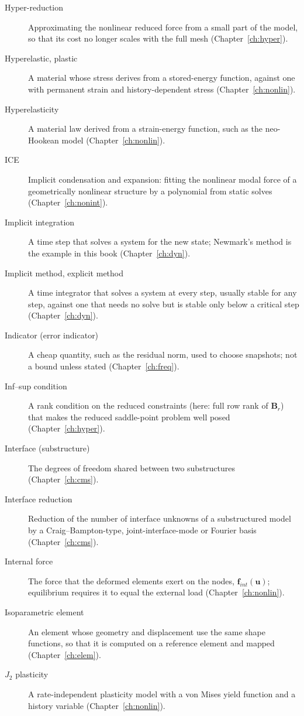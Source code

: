 \begin{description}
\item[Hyper-reduction] Approximating the nonlinear reduced force from a small part of the model, so that its cost no longer scales with the full mesh (Chapter~\ref{ch:hyper}).
\item[Hyperelastic, plastic] A material whose stress derives from a stored-energy function, against one with permanent strain and history-dependent stress (Chapter~\ref{ch:nonlin}).
\item[Hyperelasticity] A material law derived from a strain-energy function, such as the neo-Hookean model (Chapter~\ref{ch:nonlin}).
\item[ICE] Implicit condensation and expansion: fitting the nonlinear modal force of a geometrically nonlinear structure by a polynomial from static solves (Chapter~\ref{ch:nonint}).
\item[Implicit integration] A time step that solves a system for the new state; Newmark's method is the example in this book (Chapter~\ref{ch:dyn}).
\item[Implicit method, explicit method] A time integrator that solves a system at every step, usually stable for any step, against one that needs no solve but is stable only below a critical step (Chapter~\ref{ch:dyn}).
\item[Indicator (error indicator)] A cheap quantity, such as the residual norm, used to choose snapshots; not a bound unless stated (Chapter~\ref{ch:freq}).
\item[Inf--sup condition] A rank condition on the reduced constraints (here: full row rank of $\bm B_r$) that makes the reduced saddle-point problem well posed (Chapter~\ref{ch:hyper}).
\item[Interface (substructure)] The degrees of freedom shared between two substructures (Chapter~\ref{ch:cms}).
\item[Interface reduction] Reduction of the number of interface unknowns of a substructured model by a Craig--Bampton-type, joint-interface-mode or Fourier basis (Chapter~\ref{ch:cms}).
\item[Internal force] The force that the deformed elements exert on the nodes, $\bm f_{int}(\bm u)$; equilibrium requires it to equal the external load (Chapter~\ref{ch:nonlin}).
\item[Isoparametric element] An element whose geometry and displacement use the same shape functions, so that it is computed on a reference element and mapped (Chapter~\ref{ch:elem}).
\item[$J_2$ plasticity] A rate-independent plasticity model with a von Mises yield function and a history variable (Chapter~\ref{ch:nonlin}).

\end{description}
